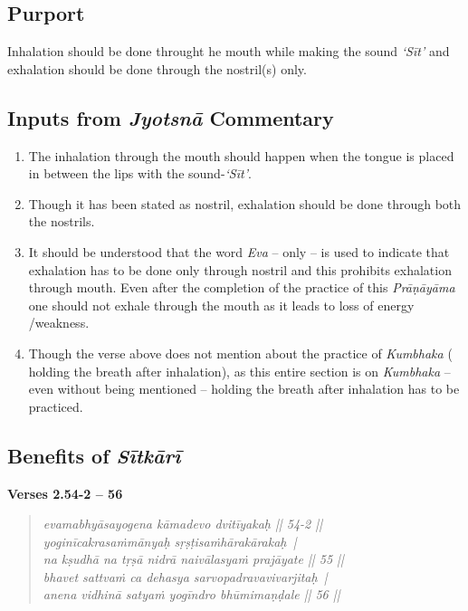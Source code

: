 \subsection*{Purport}


Inhalation should be done throught he mouth while making the sound \textit{‘Sīt’} and exhalation should be done through the nostril(s) only.

\subsection*{Inputs from \textit{Jyotsnā} Commentary}


\begin{enumerate}
\itemsep=0pt
\item The inhalation through the mouth should happen when the tongue is placed in between the lips with the sound-\textit{‘Sīt’}.
\item Though it has been stated as nostril, exhalation should be done through both the nostrils. 
\item It should be understood that the word \textit{Eva} – only – is used to indicate that exhalation has to be done only through nostril and this prohibits exhalation through mouth. Even after the completion of the practice of this \textit{Prāṇāyāma} one should not exhale through the mouth as it leads to loss of energy /weakness. 
\item Though the verse above does not mention about the practice of \textit{Kumbhaka} ( holding the breath after inhalation), as this entire section is on \textit{Kumbhaka} – even without being mentioned – holding the breath after inhalation has to be practiced. 
\end{enumerate}

\subsection*{Benefits of \textit{Sītkārī}}


\noindent \textbf{Verses 2.54-2 -- 56}

\begin{verse}
\textit{evamabhyāsayogena kāmadevo dvitīyakaḥ || 54-2 ||\\
yoginīcakrasaṁmānyaḥ sṛṣṭisaṁhārakārakaḥ |\\
na kṣudhā na tṛṣā nidrā naivālasyaṁ prajāyate || 55 ||\\
bhavet sattvaṁ ca dehasya sarvopadravavivarjitaḥ |\\
anena vidhinā satyaṁ yogīndro bhūmimaṇḍale || 56 ||}
\end{verse}

